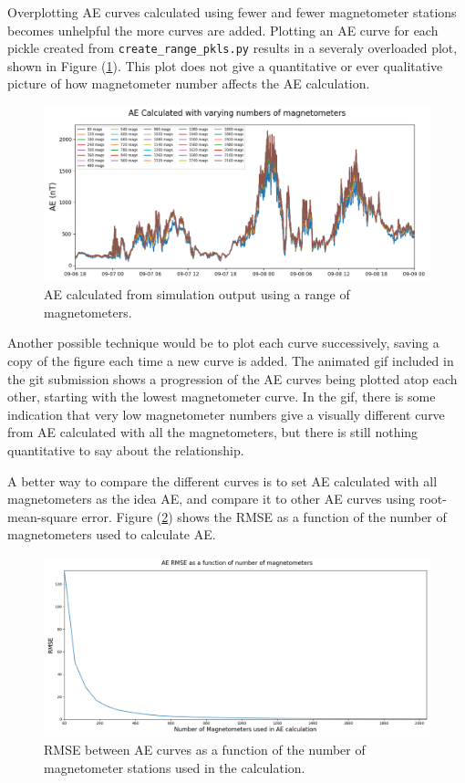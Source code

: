 \documentclass[12pt, letterpaper]{article}
\begin{document}
Overplotting AE curves calculated using fewer and fewer magnetometer stations becomes unhelpful the more curves are added. Plotting an AE curve for each pickle created from \texttt{create\_range\_pkls.py} results in a severaly overloaded plot, shown in Figure (\ref{fig:allae}). This plot does not give a quantitative or ever qualitative picture of how magnetometer number affects the AE calculation.

\begin{figure}[!ht]
  \centering
  \includegraphics[width=14cm]{../ae_plots_LaTeX/all_ae.png}
  \caption{AE calculated from simulation output using a range of magnetometers.}
  \label{fig:allae}
\end{figure}

Another possible technique would be to plot each curve successively, saving a copy of the figure each time a new curve is added. The animated gif included in the git submission shows a progression of the AE curves being plotted atop each other, starting with the lowest magnetometer curve. In the gif, there is some indication that very low magnetometer numbers give a visually different curve from AE calculated with all the magnetometers, but there is still nothing quantitative to say about the relationship.

A better way to compare the different curves is to set AE calculated with all magnetometers as the idea AE, and compare it to other AE curves using root-mean-square error. Figure (\ref{fig:rmse}) shows the RMSE as a function of the number of magnetometers used to calculate AE.

\begin{figure}[!ht]
  \centering
  \includegraphics[width=14cm]{../ae_plots_LaTeX/rmse_v_num_mags.png}
  \caption{RMSE between AE curves as a function of the number of magnetometer stations used in the calculation.}
  \label{fig:rmse}
\end{figure}
\end{document}
